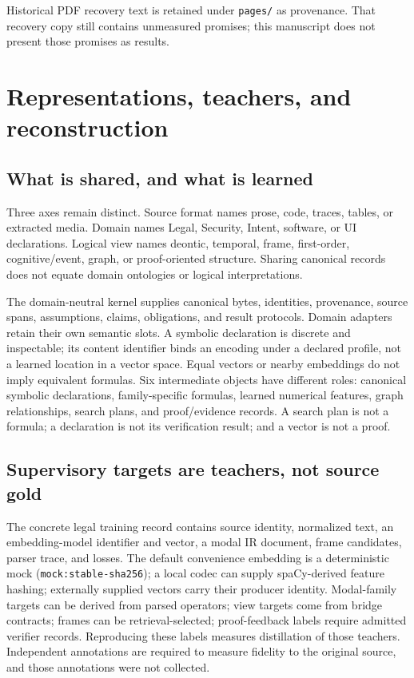 \documentclass{article}
\begin{document}
Historical PDF recovery text is retained under \texttt{pages/} as provenance. That recovery copy still contains unmeasured promises; this manuscript does not present those promises as results.

\section{Representations, teachers, and reconstruction}
\subsection{What is shared, and what is learned}
Three axes remain distinct. Source format names prose, code, traces, tables, or extracted media. Domain names Legal, Security, Intent, software, or UI declarations. Logical view names deontic, temporal, frame, first-order, cognitive/event, graph, or proof-oriented structure. Sharing canonical records does not equate domain ontologies or logical interpretations.

The domain-neutral kernel supplies canonical bytes, identities, provenance, source spans, assumptions, claims, obligations, and result protocols. Domain adapters retain their own semantic slots. A symbolic declaration is discrete and inspectable; its content identifier binds an encoding under a declared profile, not a learned location in a vector space. Equal vectors or nearby embeddings do not imply equivalent formulas. Six intermediate objects have different roles: canonical symbolic declarations, family-specific formulas, learned numerical features, graph relationships, search plans, and proof/evidence records. A search plan is not a formula; a declaration is not its verification result; and a vector is not a proof.

\subsection{Supervisory targets are teachers, not source gold}
The concrete legal training record contains source identity, normalized text, an embedding-model identifier and vector, a modal IR document, frame candidates, parser trace, and losses. The default convenience embedding is a deterministic mock (\texttt{mock:stable-sha256}); a local codec can supply spaCy-derived feature hashing; externally supplied vectors carry their producer identity. Modal-family targets can be derived from parsed operators; view targets come from bridge contracts; frames can be retrieval-selected; proof-feedback labels require admitted verifier records. Reproducing these labels measures distillation of those teachers. Independent annotations are required to measure fidelity to the original source, and those annotations were not collected.
\end{document}
